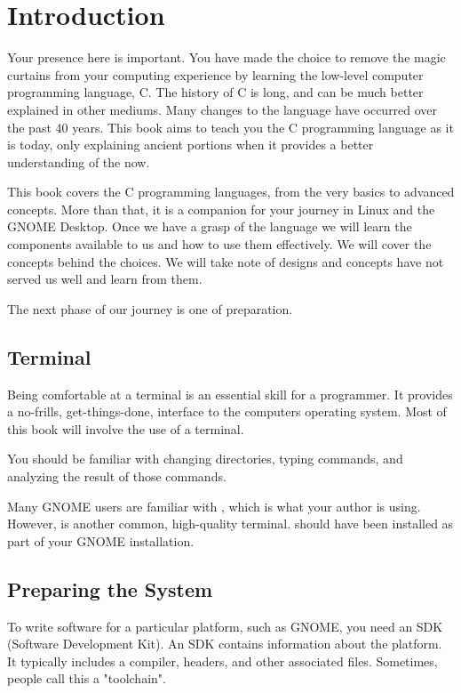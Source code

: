\chapter{Introduction}

Your presence here is important. You have made the choice to remove the magic
curtains from your computing experience by learning the low-level computer
programming language, C. The history of C is long, and can be much better
explained in other mediums. Many changes to the language have occurred over
the past 40 years. This book aims to teach you the C programming language as
it is today, only explaining ancient portions when it provides a better
understanding of the now.

This book covers the C programming languages, from the very basics to advanced
concepts. More than that, it is a companion for your journey in Linux and the
GNOME Desktop. Once we have a grasp of the language we will learn the
components available to us and how to use them effectively. We will cover the
concepts behind the choices. We will take note of designs and concepts have
not served us well and learn from them.

The next phase of our journey is one of preparation.


\section{Terminal}

Being comfortable at a terminal is an essential skill for a programmer. It
provides a no-frills, get-things-done, interface to the computers operating
system. Most of this book will involve the use of a terminal.

You should be familiar with changing directories, typing commands, and
analyzing the result of those commands.

Many GNOME users are familiar with , which is what your
author is using. However,  is another common, high-quality
terminal.  should have been installed as part of your
GNOME installation.


\section{Preparing the System}

To write software for a particular platform, such as GNOME, you need an SDK
(Software Development Kit). An SDK contains information about the platform. It
typically includes a compiler, headers, and other associated files. Sometimes,
people call this a "toolchain".


